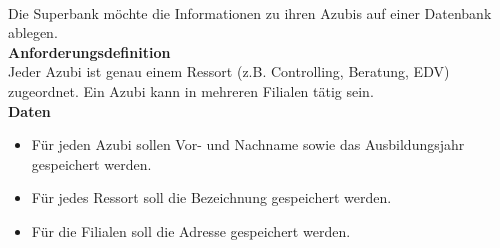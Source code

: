 \documentclass[a4paper,12pt, headsepline, ngerman]{scrartcl}
\begin{document}
	
	\begin{Exercise}[title={Erstelle ein ERM zu folgendem Sachverhalt. (9P)}, label=KAERMAufstellen]\\
		Die Superbank möchte die Informationen zu ihren Azubis auf einer Datenbank ablegen.\\
		\textbf{Anforderungsdefinition}\\
		Jeder Azubi ist genau einem Ressort (z.B. Controlling, Beratung, EDV) zugeordnet. Ein Azubi kann in mehreren Filialen tätig sein.\\
		\textbf{Daten}\\
		\begin{itemize}
			\item Für jeden Azubi sollen Vor- und Nachname sowie das Ausbildungsjahr gespeichert werden.
			\item Für jedes Ressort soll die Bezeichnung gespeichert werden.
			\item Für die Filialen soll die Adresse gespeichert werden.
		\end{itemize}	
	\end{Exercise}

	
	
	
	
	
	
	
	
\end{document}
